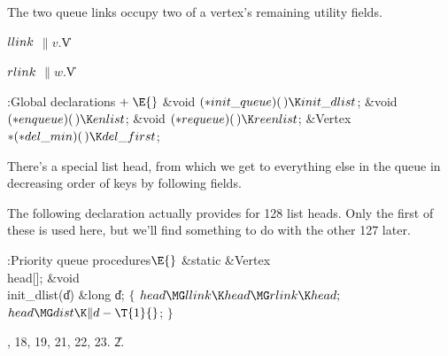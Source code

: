 The two queue links occupy two of a vertex's remaining utility fields.

\Y\B\4\D$\\{llink}$ \5
$\|v.{}$\|V%
\par
\B\4\D$\\{rlink}$ \5
$\|w.{}$\|V%
\par
\Y\B\4:Global declarations\X${}\mathrel+\E{}$\6
\&{void} ${}({*}\\{init\_queue})(\,)\K\\{init\_dlist}{}$;\6
\&{void} ${}({*}\\{enqueue})(\,)\K\\{enlist}{}$;\6
\&{void} ${}({*}\\{requeue})(\,)\K\\{reenlist}{}$;\6
\&{Vertex} ${}{*}({*}\\{del\_min})(\,)\K\\{del\_first}{}$;\par
\fi

There's a special list head, from which we get to everything else in the
queue in decreasing order of keys by following  fields.

The following declaration actually provides for 128 list heads. Only the first
of these is used here, but we'll find something to do with the
other 127 later.

\Y\B\4:Priority queue procedures\X${}\E{}$\6
\&{static} \&{Vertex} \\{head}[];\7
\&{void} \\{init\_dlist}(\|d)\1\1\6
\&{long} \|d;\2\2\6
${}\{{}$\1\6
${}\\{head}\MG\\{llink}\K\\{head}\MG\\{rlink}\K\\{head};{}$\6
${}\\{head}\MG\\{dist}\K\|d-\T{1}{}$;\6
\4${}\}{}$\2\par
{}, 18, 19, 21, 22, 23.
\U2.\fi

